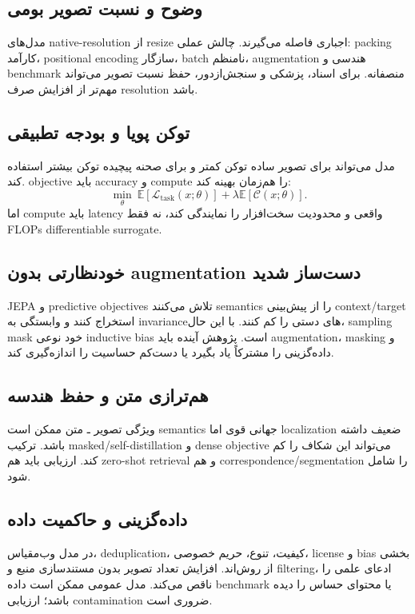 \documentclass[12pt,openany,oneside]{book}
\newcommand{\E}{\mathbb{E}}
\begin{document}
\subsection{وضوح و نسبت تصویر بومی}
مدل‌های native-resolution از resize اجباری فاصله می‌گیرند. چالش عملی: packing کارآمد، positional encoding سازگار، batch نامنظم، augmentation هندسی و benchmark منصفانه. برای اسناد، پزشکی و سنجش‌ازدور، حفظ نسبت تصویر می‌تواند مهم‌تر از افزایش صرف resolution باشد.

\subsection{توکن پویا و بودجه تطبیقی}
مدل می‌تواند برای تصویر ساده توکن کمتر و برای صحنه پیچیده توکن بیشتر استفاده کند. objective باید accuracy و compute را هم‌زمان بهینه کند:
\begin{equation}
\min_\theta\ \E[\mathcal L_{\mathrm{task}}(x;\theta)]
+\lambda\E[\mathcal C(x;\theta)].
\end{equation}
اما compute باید latency واقعی و محدودیت سخت‌افزار را نمایندگی کند، نه فقط FLOPs differentiable surrogate.

\subsection{خودنظارتی بدون augmentation دست‌ساز شدید}
JEPA و predictive objectives تلاش می‌کنند semantics را از پیش‌بینی context/target استخراج کنند و وابستگی به invarianceهای دستی را کم کنند. با این حال، sampling mask خود نوعی inductive bias است. پژوهش آینده باید augmentation، masking و داده‌گزینی را مشترکاً یاد بگیرد یا دست‌کم حساسیت را اندازه‌گیری کند.

\subsection{هم‌ترازی متن و حفظ هندسه}
ویژگی تصویر ـ متن ممکن است semantics جهانی قوی اما localization ضعیف داشته باشد. ترکیب masked/self-distillation و dense objective می‌تواند این شکاف را کم کند. ارزیابی باید هم zero-shot retrieval و هم correspondence/segmentation را شامل شود.

\subsection{داده‌گزینی و حاکمیت داده}
در مدل وب‌مقیاس، deduplication، کیفیت، تنوع، حریم خصوصی، license و bias بخشی از روش‌اند. افزایش تعداد تصویر بدون مستندسازی منبع و filtering، ادعای علمی را ناقص می‌کند. مدل عمومی ممکن است داده benchmark یا محتوای حساس را دیده باشد؛ ارزیابی contamination ضروری است.
\end{document}
